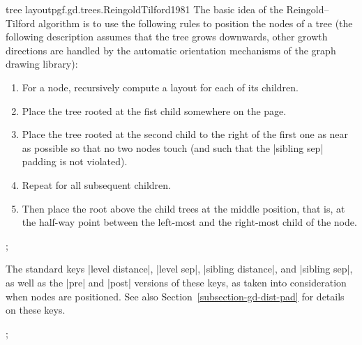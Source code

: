 \begin{gdalgorithm}{tree layout}{pgf.gd.trees.ReingoldTilford1981}
  The basic idea of the Reingold--Tilford algorithm is to use the
  following rules to position the nodes of a tree (the following
  description assumes that the tree grows downwards, other growth
  directions are handled by the automatic orientation mechanisms of
  the graph drawing library): 
  \begin{enumerate}
  \item For a node, recursively compute a layout for each of its children.
  \item Place the tree rooted at the fist child somewhere on the page.
  \item Place the tree rooted at the second child to the right of the
    first one as near as possible so that no two nodes touch (and such
    that the |sibling sep| padding is not violated).
  \item Repeat for all subsequent children.
  \item Then place the root above the child trees at the middle
    position, that is, at the half-way point between the left-most and
    the right-most child of the node.
  \end{enumerate}
\begin{codeexample}[]
\tikz [tree layout, sibling distance=8mm]
;
\end{codeexample}
  The standard keys |level distance|, |level sep|, |sibling distance|,
  and |sibling sep|, as well as the |pre| and |post| versions of these
  keys, as taken into consideration when nodes are positioned. See also
  Section~\ref{subsection-gd-dist-pad} for details on these keys. 
\begin{codeexample}[]
\tikz [tree layout, grow=-30,
       sibling distance=0mm, level distance=0mm,]
;
\end{codeexample}


\end{gdalgorithm}
